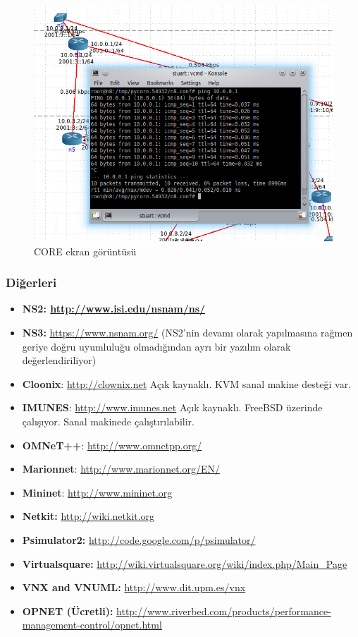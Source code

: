 \begin{figure}[h]
    \centering
    \includegraphics[width=\textwidth]{images/SimulatorCORE.png}
    \caption{CORE ekran görüntüsü}
    \label{fig:CORE}
\end{figure}

\subsubsection{Diğerleri}

\begin{itemize}
\item {\bfseries
NS2:\textmd{ }\url{http://www.isi.edu/nsnam/ns/}\textmd{ }}
\item \textbf{NS3:} \url{https://www.nsnam.org/} (NS2'nin devamı olarak yapılmasına rağmen geriye doğru uyumluluğu
olmadığından ayrı bir yazılım olarak değerlendiriliyor)
\end{itemize}

\begin{itemize}
\item \textbf{Cloonix}: \href{http://clownix.net/}{http://clownix.net} Açık kaynaklı. KVM sanal makine desteği var.
\item \textbf{IMUNES}: \href{http://www.imunes.net/}{http://www.imunes.net} Açık kaynaklı. FreeBSD üzerinde çalışıyor.
Sanal makinede çalıştırılabilir.
\item \textbf{OMNeT++}: \url{http://www.omnetpp.org/}
\item \textbf{Marionnet}: \url{http://www.marionnet.org/EN/}
\item \textbf{Mininet}: \href{http://www.mininet.org/}{http://www.mininet.org}
\item \textbf{Netkit:} \href{http://wiki.netkit.org/}{http://wiki.netkit.org}
\item \textbf{Psimulator2:} \url{http://code.google.com/p/psimulator/}
\item \textbf{Virtualsquare:} \url{http://wiki.virtualsquare.org/wiki/index.php/Main_Page}
\item \textbf{VNX and VNUML:} \url{http://www.dit.upm.es/vnx}
\item \textbf{OPNET (Ücretli):} \url{http://www.riverbed.com/products/performance-management-control/opnet.html}
\end{itemize}
